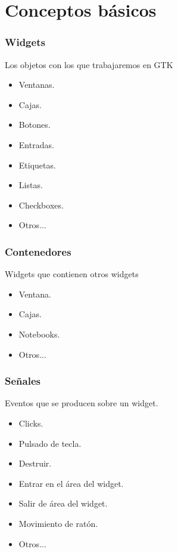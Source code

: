 \documentclass[10pt]{beamer}
\begin{document}
  \section{Conceptos básicos}
  \begin{frame}[containsverbatim]
    \frametitle{Widgets}
  
    Los objetos con los que trabajaremos en GTK
    \begin{itemize}
      \item Ventanas.
      \item Cajas.
      \item Botones.
      \item Entradas.
      \item Etiquetas.
      \item Listas.
      \item Checkboxes.
      \item Otros...
    \end{itemize}
  \end{frame}
  
  \begin{frame}[containsverbatim]
    \frametitle{Contenedores}
  
    Widgets que contienen otros widgets
    \begin{itemize}
      \item Ventana.
      \item Cajas.
      \item Notebooks.
      \item Otros...
    \end{itemize}
  \end{frame}
  
  \begin{frame}[containsverbatim]
    \frametitle{Señales}
  
    Eventos que se producen sobre un widget.
    \begin{itemize}
      \item Clicks.
      \item Pulsado de tecla.
      \item Destruir.
      \item Entrar en el área del widget.
      \item Salir de área del widget.
      \item Movimiento de ratón.
      \item Otros...
    \end{itemize}
  \end{frame}
\end{document}
